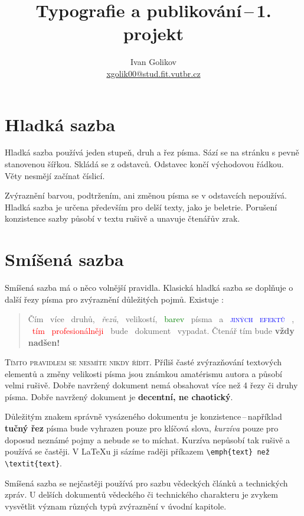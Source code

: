 \documentclass[10pt, a4paper, twocolumn]{article}
\title{Typografie a publikování\,--\,1. projekt}
\author{Ivan Golikov \\ 
\href{mailto:xgolik00@stud.fit.vutbr.cz}{xgolik00@stud.fit.vutbr.cz}}
\date{}
\begin{document}
\maketitle

\section{Hladká sazba}

Hladká sazba používá jeden stupeň, druh a řez písma.
Sází se na stránku s pevně stanovenou šířkou.
Skládá se z odstavců. Odstavec končí východovou řádkou.
Věty nesmějí začínat číslicí.

Zvýraznění barvou, podtržením, ani změnou písma se v odstavcích nepoužívá.
Hladká sazba je určena především pro delší texty, jako je beletrie.
Porušení konzistence sazby působí v textu rušivě a unavuje čtenářův zrak.

\section{Smíšená sazba} \label{sec:SmisenaSazba}

Smíšená sazba má o něco volnější pravidla.
Klasická hladká sazba se doplňuje o další řezy písma pro zvýraznění důležitých pojmů.
Existuje :

\begin{quotation}
    Čím \ více \ {\selectfont druhů}, \ \emph{řezů}, \ {\tiny velikostí}, \ \textcolor{green}{barev} \ písma \ a \ \textsc{\textcolor{blue}{jiných \ efektů}} \ , \ \textcolor{red}{tím \ profesionálněji} \ bude \ {\selectfont dokument} \ vypadat.
    Čtenář tím bude \textbf{\Huge vždy nadšen!}
\end{quotation}

\textsc{Tímto pravidlem se nesmíte nikdy řídit.}
Příliš časté zvýrazňování textových elementů a změny velikosti písma jsou známkou amatérismu autora a působí velmi rušivě.
Dobře navržený dokument nemá obsahovat více než 4 řezy či druhy písma.
Dobře navržený dokument je \textbf{decentní, ne chaotický}.

Důležitým znakem správně vysázeného dokumentu je konzistence\,--\,například \textbf{tučný řez} písma bude vyhrazen pouze pro klíčová slova, \emph{kurzíva} pouze pro doposud neznámé pojmy a nebude se to míchat.
Kurzíva nepůsobí tak rušivě a používá se častěji.
V \LaTeX u ji sázíme raději příkazem \verb|\emph{text} než \textit{text}|.

Smíšená sazba se nejčastěji používá pro sazbu vědeckých článků a technických zpráv.
U delších dokumentů vědeckého či technického charakteru je zvykem vysvětlit význam různých typů zvýraznění v úvodní kapitole.
\end{document}
